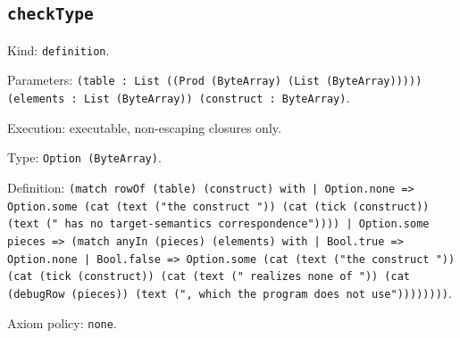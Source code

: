 \documentclass[11pt]{article}
\begin{document}
\subsection*{\texttt{checkType}}
\noindent Kind: \texttt{definition}.\par
\noindent Parameters: \texttt{(table : List ((Prod (ByteArray) (List (ByteArray))))) (elements : List (ByteArray)) (construct : ByteArray)}.\par
\noindent Execution: executable, non-escaping closures only.\par
\noindent Type: \texttt{Option (ByteArray)}.\par
\noindent Definition: \texttt{(match rowOf (table) (construct) with | Option.none => Option.some (cat (text ("the construct ")) (cat (tick (construct)) (text (" has no target-semantics correspondence")))) | Option.some pieces => (match anyIn (pieces) (elements) with | Bool.true => Option.none | Bool.false => Option.some (cat (text ("the construct ")) (cat (tick (construct)) (cat (text (" realizes none of ")) (cat (debugRow (pieces)) (text (", which the program does not use"))))))))}.\par
\noindent Axiom policy: \texttt{none}.\par
\end{document}
